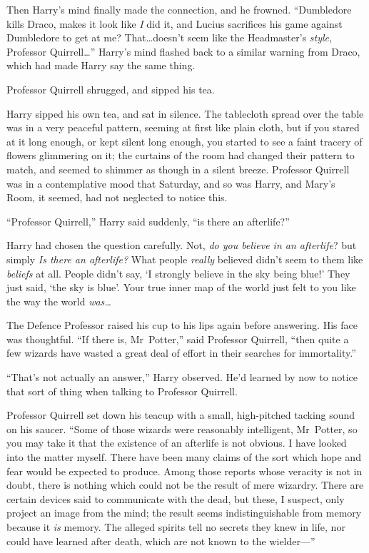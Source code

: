 Then Harry’s mind finally made the connection, and he frowned.
“Dumbledore kills Draco, makes it look like \emph{I} did it, and Lucius sacrifices his game against Dumbledore to get at me? That…doesn’t seem like the Headmaster’s \emph{style}, Professor Quirrell…” Harry’s mind flashed back to a similar warning from Draco, which had made Harry say the same thing.

Professor Quirrell shrugged, and sipped his tea.

Harry sipped his own tea, and sat in silence. The tablecloth spread over the table was in a very peaceful pattern, seeming at first like plain cloth, but if you stared at it long enough, or kept silent long enough, you started to see a faint tracery of flowers glimmering on it; the curtains of the room had changed their pattern to match, and seemed to shimmer as though in a silent breeze. Professor Quirrell was in a contemplative mood that Saturday, and so was Harry, and Mary’s Room, it seemed, had not neglected to notice this.

“Professor Quirrell,” Harry said suddenly, “is there an afterlife?”

Harry had chosen the question carefully. Not, \emph{do you believe in an afterlife}? but simply \emph{Is there an afterlife?} What people \emph{really} believed didn’t seem to them like \emph{beliefs} at all. People didn’t say, ‘I strongly believe in the sky being blue!’ They just said, ‘the sky is blue’. Your true inner map of the world just felt to you like the way the world \emph{was…}

The Defence Professor raised his cup to his lips again before answering. His face was thoughtful.
“If there is, Mr~Potter,” said Professor Quirrell, “then quite a few wizards have wasted a great deal of effort in their searches for immortality.”

“That’s not actually an answer,” Harry observed. He’d learned by now to notice that sort of thing when talking to Professor Quirrell.

Professor Quirrell set down his teacup with a small, high-pitched tacking sound on his saucer.
“Some of those wizards were reasonably intelligent, Mr~Potter, so you may take it that the existence of an afterlife is not obvious. I have looked into the matter myself. There have been many claims of the sort which hope and fear would be expected to produce. Among those reports whose veracity is not in doubt, there is nothing which could not be the result of mere wizardry. There are certain devices said to communicate with the dead, but these, I suspect, only project an image from the mind; the result seems indistinguishable from memory because it \emph{is} memory. The alleged spirits tell no secrets they knew in life, nor could have learned after death, which are not known to the wielder—”

